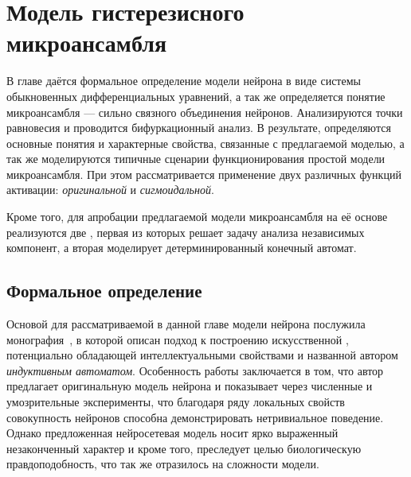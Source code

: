 \chapter{Модель гистерезисного микроансамбля} \label{chapter:neuron}

В главе даётся формальное определение модели нейрона в виде системы обыкновенных дифференциальных уравнений, а так же определяется понятие микроансамбля --- сильно связного объединения нейронов. Анализируются точки равновесия и проводится бифуркационный анализ. В результате, определяются основные понятия и характерные свойства, связанные с предлагаемой моделью, а так же моделируются типичные сценарии функционирования простой модели микроансамбля. При этом рассматривается применение двух различных функций активации: \textit{оригинальной} и \textit{сигмоидальной}. 

Кроме того, для апробации предлагаемой модели микроансамбля на её основе реализуются две , первая из которых решает задачу анализа независимых компонент, а вторая моделирует детерминированный конечный автомат. 


\section{Формальное определение} \label{section:neuron_model}

Основой для рассматриваемой в данной главе модели нейрона послужила монография~\cite{EmelyanovYaroslavsky1990}, в которой описан подход к построению искусственной , потенциально обладающей интеллектуальными свойствами и названной автором \textit{индуктивным автоматом}. Особенность работы заключается в том, что автор предлагает оригинальную модель нейрона и показывает через численные и умозрительные эксперименты, что благодаря ряду локальных свойств совокупность нейронов способна демонстрировать нетривиальное поведение. Однако предложенная нейросетевая модель носит ярко выраженный незаконченный характер и кроме того, преследует целью биологическую правдоподобность, что так же отразилось на сложности модели.

